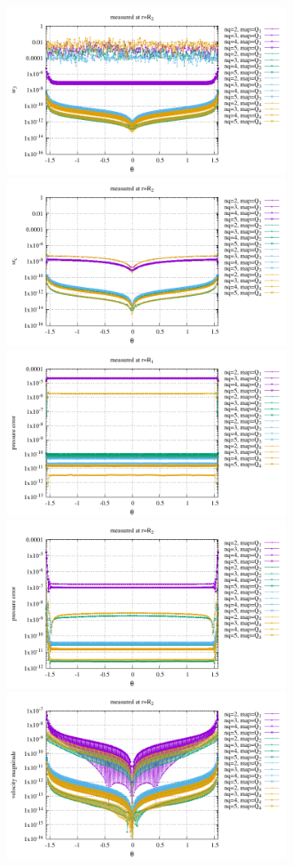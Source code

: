 \begin{center}
\includegraphics[width=8.3cm]{python_codes/fieldstone_152/results/exp1_axisymmetric/sr3_R2}
\includegraphics[width=8.3cm]{python_codes/fieldstone_152/results/exp1_axisymmetric/src_R2}\\
\includegraphics[width=8.3cm]{python_codes/fieldstone_152/results/exp1_axisymmetric/qqq_R1}
\includegraphics[width=8.3cm]{python_codes/fieldstone_152/results/exp1_axisymmetric/qqq_R2}\\
\includegraphics[width=8.3cm]{python_codes/fieldstone_152/results/exp1_axisymmetric/vel_R2}

\end{center}
